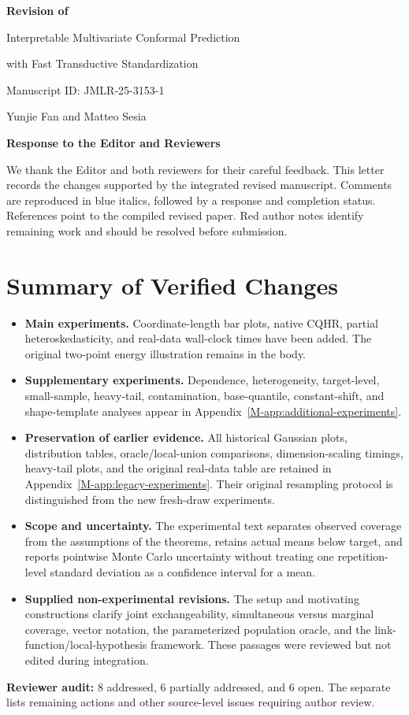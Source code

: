 \documentclass[11pt]{article}
\newcommand{\msapp}[1]{Appendix~\ref*{M-#1}}
\begin{document}
\begin{center}
{\Large\bfseries Revision of\par
Interpretable Multivariate Conformal Prediction\par
with Fast Transductive Standardization\par}
\vspace{0.7em}
Manuscript ID: JMLR-25-3153-1\par
Yunjie Fan and Matteo Sesia\par
\vspace{0.5em}
{\large\bfseries Response to the Editor and Reviewers}
\end{center}
We thank the Editor and both reviewers for their careful feedback. This letter
records the changes supported by the integrated revised manuscript. Comments
are reproduced in blue italics, followed by a response and completion status.
References point to the compiled revised paper. Red author notes identify
remaining work and should be resolved before submission.

\section*{Summary of Verified Changes}
\begin{itemize}
\item \textbf{Main experiments.} Coordinate-length bar plots, native CQHR,
partial heteroskedasticity, and real-data wall-clock times have been added.
The original two-point energy illustration remains in the body.
\item \textbf{Supplementary experiments.} Dependence, heterogeneity, target-level,
small-sample, heavy-tail, contamination, base-quantile, constant-shift, and
shape-template analyses appear in \msapp{app:additional-experiments}.
\item \textbf{Preservation of earlier evidence.} All historical Gaussian plots,
distribution tables, oracle/local-union comparisons, dimension-scaling timings,
heavy-tail plots, and the original real-data table are retained in
\msapp{app:legacy-experiments}. Their original resampling protocol is
distinguished from the new fresh-draw experiments.
\item \textbf{Scope and uncertainty.} The experimental text separates observed
coverage from the assumptions of the theorems, retains actual means below
target, and reports pointwise Monte Carlo uncertainty without treating one
repetition-level standard deviation as a confidence interval for a mean.
\item \textbf{Supplied non-experimental revisions.} The setup and motivating
constructions clarify joint exchangeability, simultaneous versus marginal
coverage, vector notation, the parameterized population oracle, and the
link-function/local-hypothesis framework. These passages were reviewed but
not edited during integration.
\end{itemize}
\textbf{Reviewer audit:} 8 addressed, 6 partially addressed, and 6 open.
The separate  lists remaining
actions and other source-level issues requiring author review.
\end{document}
